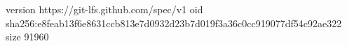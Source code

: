 version https://git-lfs.github.com/spec/v1
oid sha256:e8feab13f6e8631ccb813e7d0932d23b7d019f3a36c0cc919077df54c92ae322
size 91960
